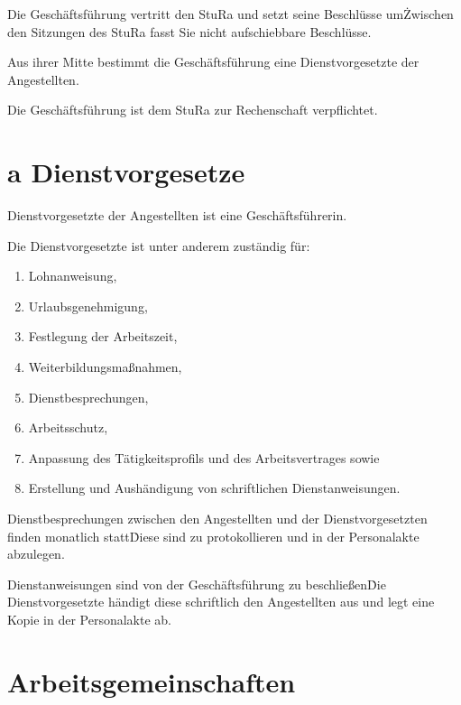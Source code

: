 \begin{multicols}{2}
\Abs \Satz Die Geschäftsführung vertritt den StuRa und setzt seine Beschlüsse um\. Zwischen den Sitzungen des StuRa fasst Sie nicht aufschiebbare Beschlüsse.

\Abs \Satz Aus ihrer Mitte bestimmt die Geschäftsführung eine Dienstvorgesetzte der Angestellten.

\Abs \Satz Die Geschäftsführung ist dem StuRa zur Rechenschaft verpflichtet.



\setcounter{section}{26}
\section{a Dienstvorgesetze}

\Abs \Satz Dienstvorgesetzte der Angestellten ist eine Geschäftsführerin.

\Abs \Satz Die Dienstvorgesetzte ist unter anderem zuständig für:
\begin{enumerate}
\item Lohnanweisung,
\item Urlaubsgenehmigung,
\item Festlegung der Arbeitszeit,
\item Weiterbildungsmaßnahmen,
\item Dienstbesprechungen,
\item Arbeitsschutz,
\item Anpassung des Tätigkeitsprofils und des Arbeitsvertrages sowie
\item Erstellung und Aushändigung von schriftlichen Dienstanweisungen.
\end{enumerate}

\Abs \Satz Dienstbesprechungen zwischen den Angestellten und der Dienstvorgesetzten finden monatlich statt\. Diese sind zu protokollieren und in der Personalakte abzulegen.

\Abs \Satz Dienstanweisungen sind von der Geschäftsführung zu beschließen\. Die Dienstvorgesetzte händigt diese schriftlich den Angestellten aus und legt eine Kopie in der Personalakte ab.

\setcounter{section}{27}



\section{Arbeitsgemeinschaften} %


\end{multicols}
